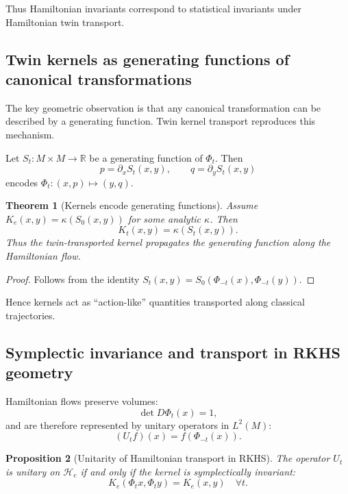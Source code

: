 \documentclass[11pt]{article}
\newtheorem{theorem}{Theorem}[section]
\newtheorem{proposition}[theorem]{Proposition}
\theoremstyle{definition}
\begin{document}
Thus Hamiltonian invariants correspond to statistical invariants under Hamiltonian twin transport.

\subsection{Twin kernels as generating functions of canonical transformations}

The key geometric observation is that any canonical transformation can be described by a generating function.
Twin kernel transport reproduces this mechanism.

Let $S_t:M\times M\to \mathbb{R}$ be a generating function of $\Phi_t$.
Then
\[
p = \partial_x S_t(x,y),\qquad
q = \partial_y S_t(x,y)
\]
encodes $\Phi_t:(x,p)\mapsto (y,q)$.

\begin{theorem}[Kernels encode generating functions]
	Assume $K_e(x,y)=\kappa(S_0(x,y))$ for some analytic $\kappa$.
	Then
	\[
	K_t(x,y)=\kappa(S_t(x,y)).
	\]
	Thus the twin-transported kernel propagates the generating function along the Hamiltonian flow.
\end{theorem}

\begin{proof}
	Follows from the identity $S_t(x,y)=S_0(\Phi_{-t}(x),\Phi_{-t}(y))$.
\end{proof}

Hence kernels act as “action-like” quantities transported along classical trajectories.

\subsection{Symplectic invariance and transport in RKHS geometry}

Hamiltonian flows preserve volumes:
\[
\det D\Phi_t(x)=1,
\]
and are therefore represented by unitary operators in $L^2(M)$:
\[
(U_t f)(x)=f(\Phi_{-t}(x)).
\]

\begin{proposition}[Unitarity of Hamiltonian transport in RKHS]
	The operator $U_t$ is unitary on $\mathcal{H}_e$ if and only if the kernel is symplectically invariant:
	\[
	K_e(\Phi_t x,\Phi_t y)= K_e(x,y)
	\quad\forall t.
	\]
\end{proposition}
\end{document}
